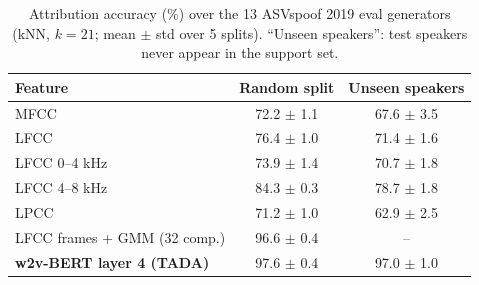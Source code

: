 \begin{table}[t]
\centering\small
\caption{Attribution accuracy (\%) over the 13 ASVspoof 2019 eval generators (kNN, $k=21$; mean $\pm$ std over 5 splits). ``Unseen speakers'': test speakers never appear in the support set.}
\label{tab:attr}
\begin{tabular}{lcc}
\toprule
Feature & Random split & Unseen speakers \\
\midrule
MFCC & 72.2 $\pm$ 1.1 & 67.6 $\pm$ 3.5 \\
LFCC & 76.4 $\pm$ 1.0 & 71.4 $\pm$ 1.6 \\
LFCC 0--4 kHz & 73.9 $\pm$ 1.4 & 70.7 $\pm$ 1.8 \\
LFCC 4--8 kHz & 84.3 $\pm$ 0.3 & 78.7 $\pm$ 1.8 \\
LPCC & 71.2 $\pm$ 1.0 & 62.9 $\pm$ 2.5 \\
LFCC frames + GMM (32 comp.) & 96.6 $\pm$ 0.4 & -- \\
\textbf{w2v-BERT layer 4 (TADA)} & 97.6 $\pm$ 0.4 & 97.0 $\pm$ 1.0 \\
\bottomrule
\end{tabular}
\end{table}